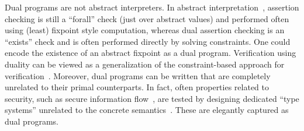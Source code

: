 \documentclass[preprint]{sig-alternate-05-2015}
\begin{document}
Dual programs are not abstract interpreters. In abstract interpretation~\cite{CousotCousot77:POPL},
assertion checking is still a ``forall'' check (just over abstract values) and performed
often using (least) fixpoint style computation,
whereas dual assertion checking is an ``exists'' check and is often performed directly
by solving constraints.  One could encode the existence of an abstract fixpoint as a 
dual program.  Verification using duality can be viewed as a  generalization of the 
constraint-based approach for verification~\cite{Gulwani08:PLDI,Gulwani13:STTT}.
Moreover, dual programs
can be written that are completely unrelated to their primal counterparts.
In fact, often properties related to security, such as
secure information flow~\cite{DBLP:journals/cacm/DenningD77,DBLP:journals/jsac/SabelfeldM03},
are tested by designing 
dedicated ``type systems'' unrelated
to the concrete semantics~\cite{DBLP:conf/csfw/Smith01,DBLP:conf/csfw/MalozemoffKG14}.
These are elegantly captured as dual programs.
\end{document}
